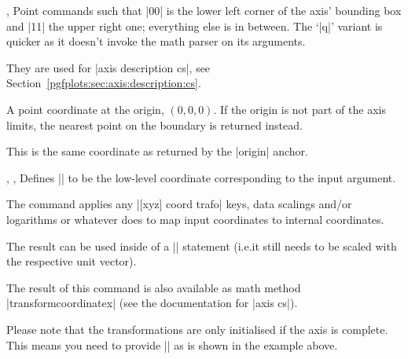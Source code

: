 \begin{commandlist}{%
    \pgfplotspointdescriptionxy{},
    \pgfplotsqpointdescriptionxy{}%
}
    Point commands such that |{0}{0}| is the lower left corner of the axis'
    bounding box and |{1}{1}| the upper right one; everything else is in
    between. The `|q|' variant is quicker as it doesn't invoke the math parser
    on its arguments.

    They are used for |axis description cs|, see
    Section~\ref{pgfplots:sec:axis:description:cs}.
\end{commandlist}

\begin{commandlist}{\pgfplotspointaxisorigin}
    A point coordinate at the origin, $(0,0,0)$. If the origin is not part of
    the axis limits, the nearest point on the boundary is returned instead.

    This is the same coordinate as returned by the |origin| anchor.
\end{commandlist}

\begin{commandlist}{%
    \pgfplotstransformcoordinatex{},
    \pgfplotstransformcoordinatey{},
    \pgfplotstransformcoordinatez{}%
}
    Defines |\pgfmathresult| to be the low-level \PGF{} coordinate
    corresponding to the input argument.

    The command applies any |[xyz] coord trafo| keys, data scalings and/or
    logarithms or whatever \PGFPlots{} does to map input coordinates to
    internal coordinates.

    The result can be used inside of a |\pgfpointxy| statement (i.e.\@ it still
    needs to be scaled with the respective \PGF{} unit vector).
\begin{codeexample}[]
\end{codeexample}
    The result of this command is also available as math method
    |transformcoordinatex| (see the documentation for |axis cs|).

    Please note that the transformations are only initialised if the axis is
    complete. This means you need to provide |\pgfplotsextra| as is shown in
    the example above.
\end{commandlist}

